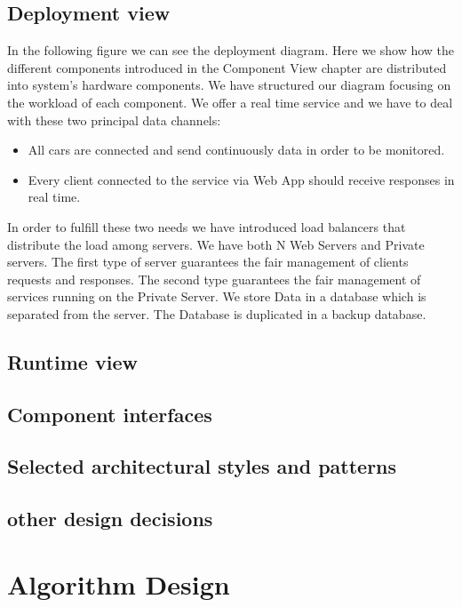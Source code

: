 \documentclass[english]{article}
\begin{document}
	\subsection{Deployment view}
	In the following figure we can see the deployment diagram. Here we show how the different components introduced in the Component View chapter are distributed into system's hardware components.
We have structured our diagram focusing on the workload of each component. We offer a real time service and we have to deal with these two principal data channels:
	\begin{itemize}
		\item All cars are connected and send continuously data in order to be monitored. 
		\item Every client connected to the service via Web App should receive responses in real time.
	\end {itemize}
In order to fulfill these two needs we have introduced load balancers that distribute the load among servers. 
We have both N Web Servers and Private servers. The first type of server guarantees the fair management of clients requests and responses. The second type guarantees the fair management of services running on the Private Server.
We store Data in a database which is separated from the server. The Database is duplicated in a backup database.

	\subsection{Runtime view}%
	\subsection{Component interfaces}
	\subsection{Selected architectural styles and patterns} %
	\subsection{other design decisions}
\section{Algorithm Design} %
\end{document}

